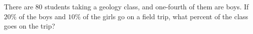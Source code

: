There are $80$ students taking a geology class, and one-fourth of them are boys. If $20\%$ of the boys and $10\%$ of the girls go on a field trip, what percent of the class goes on the trip?
